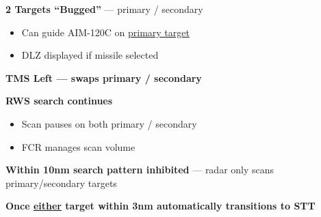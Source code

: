 \begin{tcoloritemize}
{    \begin{subitemize}
        \item \textbf{2 Targets ``Bugged''} --- primary / secondary
        \begin{itemize}
            \item Can guide AIM-120C on \underline{primary target}
            \item DLZ displayed if missile selected
        \end{itemize}
        \item \textbf{TMS Left --- swaps primary / secondary}
        \item \textbf{RWS search  continues}
        \begin{itemize}
            \item Scan pauses on both primary / secondary
            \item FCR manages scan volume
        \end{itemize}
        \item \textbf{Within 10nm search pattern inhibited} --- radar only scans primary/secondary targets
        \item \textbf{Once \underline{either} target within 3nm automatically transitions to STT}
    \end{subitemize}}
\end{tcoloritemize}

